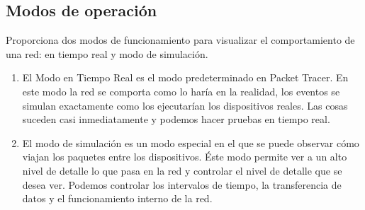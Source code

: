 \documentclass{article}
\begin{document}
\subsection{Modos de operación}
Proporciona dos modos de funcionamiento para visualizar el comportamiento de una red: en tiempo real y modo de simulación.
\begin{enumerate}
         \item El Modo en Tiempo Real es el modo predeterminado en Packet Tracer. En este modo la red se comporta como lo haría en la realidad, los eventos se simulan exactamente como los ejecutarían los dispositivos reales. Las cosas suceden casi inmediatamente y podemos hacer pruebas en tiempo real.
         \item El modo de simulación es un modo especial en el que se puede observar cómo viajan los paquetes entre los dispositivos. Éste modo permite ver a un alto nivel de detalle lo que pasa en la red y controlar el nivel de detalle que se desea ver. Podemos controlar los intervalos de tiempo, la transferencia de datos y el funcionamiento interno de la red. 
     \end{enumerate}
\end{document}
